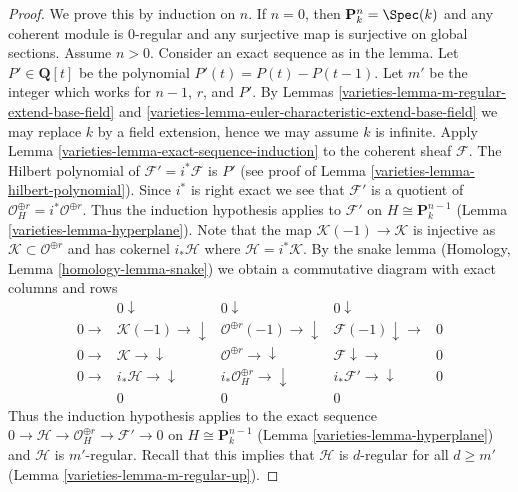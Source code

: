 \begin{proof}

We prove this by induction on $n$. If $n = 0$, then
$\mathbf{P}^n_k = \Spec(k)$ and any coherent module is $0$-regular
and any surjective map is surjective on global sections.
Assume $n > 0$. Consider an exact sequence as in the lemma.
Let $P' \in \mathbf{Q}[t]$ be the polynomial
$P'(t) = P(t) - P(t - 1)$. Let $m'$ be the integer
which works for $n - 1$, $r$, and $P'$.
By Lemmas \ref{varieties-lemma-m-regular-extend-base-field} and
\ref{varieties-lemma-euler-characteristic-extend-base-field}
we may replace $k$ by a field extension, hence we may assume
$k$ is infinite. Apply
Lemma \ref{varieties-lemma-exact-sequence-induction}
to the coherent sheaf $\mathcal{F}$.
The Hilbert polynomial of $\mathcal{F}' = i^*\mathcal{F}$
is $P'$ (see proof of Lemma \ref{varieties-lemma-hilbert-polynomial}).
Since $i^*$ is right exact we see that $\mathcal{F}'$ is
a quotient of $\mathcal{O}_H^{\oplus r} = i^*\mathcal{O}^{\oplus r}$.
Thus the induction hypothesis applies to $\mathcal{F}'$ on
$H \cong \mathbf{P}^{n - 1}_k$ (Lemma \ref{varieties-lemma-hyperplane}).
Note that the map $\mathcal{K}(-1) \to \mathcal{K}$ is injective
as $\mathcal{K} \subset \mathcal{O}^{\oplus r}$ and has
cokernel $i_*\mathcal{H}$ where $\mathcal{H} = i^*\mathcal{K}$.
By the snake lemma (Homology, Lemma \ref{homology-lemma-snake})
we obtain a commutative diagram with exact columns and rows
$$
\begin{array}{ccccc} & 0 \downarrow & 0 \downarrow & 0 \downarrow &  \\ 0 \longrightarrow & \mathcal{K}(-1) \longrightarrow\downarrow & \mathcal{O}^{\oplus r}(-1) \longrightarrow\downarrow & \mathcal{F}(-1) \downarrow\longrightarrow & 0 \\ 0 \longrightarrow & \mathcal{K} \longrightarrow\downarrow & \mathcal{O}^{\oplus r} \longrightarrow\downarrow & \mathcal{F} \downarrow\longrightarrow & 0 \\ 0 \longrightarrow & i_*\mathcal{H} \longrightarrow\downarrow & i_*\mathcal{O}_H^{\oplus r} \longrightarrow\downarrow & i_*\mathcal{F}' \longrightarrow\downarrow & 0 \\  & 0 & 0 & 0 & \end{array}
$$
Thus the induction hypothesis applies to the exact sequence
$0 \to \mathcal{H} \to \mathcal{O}_H^{\oplus r} \to \mathcal{F}' \to 0$
on $H \cong \mathbf{P}^{n - 1}_k$ (Lemma \ref{varieties-lemma-hyperplane})
and $\mathcal{H}$ is $m'$-regular. Recall that this implies that
$\mathcal{H}$ is $d$-regular for all $d \geq m'$
(Lemma \ref{varieties-lemma-m-regular-up}).


\end{proof}
